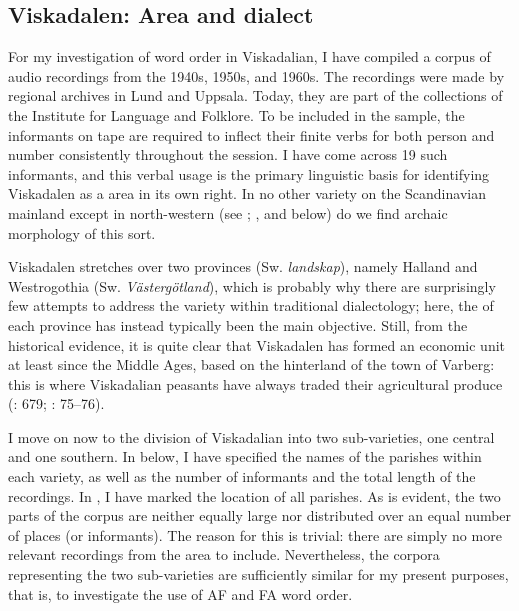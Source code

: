 \documentclass[output=paper,colorlinks,citecolor=brown,draft,draftmode]{langscibook}
\begin{document}
\subsection{Viskadalen: Area and dialect}\label{sec:petzell:2.1}


For my investigation of  word order in Viskadalian, I have compiled a corpus of audio recordings from the 1940s, 1950s, and 1960s. The recordings were made by regional  archives in Lund and Uppsala. Today, they are part of the collections of the Institute for Language and Folklore. To be included in the sample, the informants on tape are required to inflect their finite verbs for both person and number consistently throughout the session. I have come across 19 such informants, and this verbal usage is the primary linguistic basis for identifying Viskadalen as a  area in its own right. In no other variety on the Scandinavian mainland except in north-western  (see \citealt{Levander1928}; \citealt{Garbacz2010}, and  below) do we find archaic morphology of this sort.



Viskadalen stretches over two provinces (Sw. \textit{landskap}), namely Halland and Westrogothia (Sw. \textit{Västergötland}), which is probably why there are surprisingly few attempts to address the variety within traditional dialectology; here, the  of each province has instead typically been the main objective. Still, from the historical evidence, it is quite clear that Viskadalen has formed an economic unit at least since the Middle Ages, based on the hinterland of the town of Varberg: this is where Viskadalian peasants have always traded their agricultural produce (\citealt{Grill1954}: 679; \citealt{Linge1969}: 75–76).



I move on now to the division of Viskadalian into two sub-varieties, one central and one southern. In  below, I have specified the names of the parishes within each variety, as well as the number of informants and the total length of the recordings. In , I have marked the location of all parishes. As is evident, the two parts of the corpus are neither equally large nor distributed over an equal number of places (or informants). The reason for this is trivial: there are simply no more relevant recordings from the area to include. Nevertheless, the corpora representing the two sub-varieties are sufficiently similar for my present purposes, that is, to investigate the use of AF and FA word order.
\end{document}
